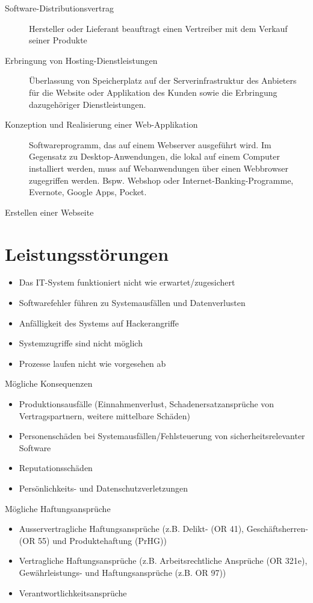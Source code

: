\begin{description}
  \item[Software-Distributionsvertrag] Hersteller oder Lieferant beauftragt einen Vertreiber mit dem Verkauf seiner Produkte
  \item[Erbringung von Hosting-Dienstleistungen] Überlassung von Speicherplatz auf der Serverinfrastruktur des Anbieters für die Website oder Applikation des Kunden sowie die Erbringung dazugehöriger Dienstleistungen.
  \item[Konzeption und Realisierung einer Web-Applikation] Softwareprogramm, das auf einem Webserver ausgeführt wird. Im Gegensatz zu Desktop-Anwendungen, die lokal auf einem Computer installiert werden, muss auf Webanwendungen über einen Webbrowser zugegriffen werden. Bspw. Webshop oder Internet-Banking-Programme, Evernote, Google Apps, Pocket.
  \item[Erstellen einer Webseite]   
\end{description}

\section{Leistungsstörungen}

\begin{itemize}
  \item Das IT-System funktioniert nicht wie erwartet/zugesichert
  \item Softwarefehler führen zu Systemausfällen und Datenverlusten
  \item Anfälligkeit des Systems auf Hackerangriffe
  \item Systemzugriffe sind nicht möglich
  \item Prozesse laufen nicht wie vorgesehen ab
\end{itemize}

\noindent
Mögliche Konsequenzen
\begin{itemize}
  \item Produktionsausfälle (Einnahmenverlust, Schadenersatzansprüche von Vertragspartnern, weitere mittelbare Schäden)
  \item Personenschäden bei Systemausfällen/Fehlsteuerung von sicherheitsrelevanter Software
  \item Reputationsschäden
  \item Persönlichkeits- und Datenschutzverletzungen
\end{itemize}

\noindent
Mögliche Haftungsansprüche
\begin{itemize}
  \item Ausservertragliche Haftungsansprüche (z.B. Delikt- (OR 41), Geschäftsherren- (OR 55) und Produktehaftung (PrHG))
  \item Vertragliche Haftungsansprüche (z.B. Arbeitsrechtliche Ansprüche (OR 321e), Gewährleistungs- und Haftungsansprüche (z.B.
OR 97))
  \item Verantwortlichkeitsansprüche
\end{itemize}

